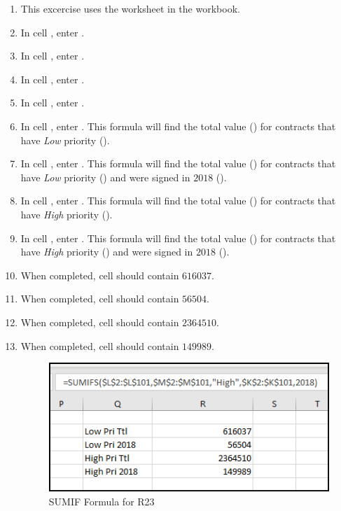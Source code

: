 \begin{enumerate}
	\item This excercise uses the  worksheet in the  workbook.
	\item In cell , enter .
	\item In cell , enter .
	\item In cell , enter .
	\item In cell , enter .
	\item In cell , enter . This formula will find the total value () for contracts that have \textit{Low} priority ().
	\item In cell , enter . This formula will find the total value () for contracts that have \textit{Low} priority () and were signed in $ 2018 $ ().
	\item In cell , enter . This formula will find the total value () for contracts that have \textit{High} priority ().
	\item In cell , enter . This formula will find the total value () for contracts that have \textit{High} priority () and were signed in $ 2018 $ ().
	\item When completed, cell  should contain $ 616037 $.
	\item When completed, cell  should contain $ 56504 $.
	\item When completed, cell  should contain $ 2364510 $.
	\item When completed, cell  should contain $ 149989 $.
	
	\begin{figure}[H]
		\centering
		\includegraphics[width=\maxwidth{.75\linewidth}]{gfx/ch09_fig42}
		\caption{SUMIF Formula for R23}
		\label{09:fig42}
	\end{figure}
	

\end{enumerate}
